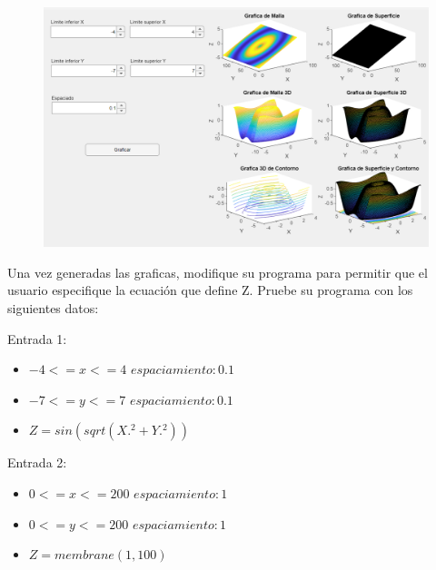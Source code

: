 \documentclass{article}
\begin{document}
	\begin{figure}[h]
		\centering
		\includegraphics[height = 11 cm]{img1.png}
	\end{figure}
	
	\newpage
	
	Una vez generadas las graficas, modifique su programa para permitir que el usuario especifique la ecuación que define Z.
	Pruebe su programa con los siguientes datos:
	
	Entrada 1:
	\begin{itemize}
		\item $-4 <= x <= 4$ $espaciamiento: 0.1$
		\item $-7 <= y <= 7$ $espaciamiento: 0.1$
		\item $Z = sin(sqrt(X .^ 2 + Y .^ 2))$
	\end{itemize}
	Entrada 2:
	\begin{itemize}
		\item $0 <= x <= 200$ $espaciamiento: 1$
		\item $0 <= y <= 200$ $espaciamiento: 1$
		\item $Z = membrane(1, 100)$
	\end{itemize}
	
\end{document}
